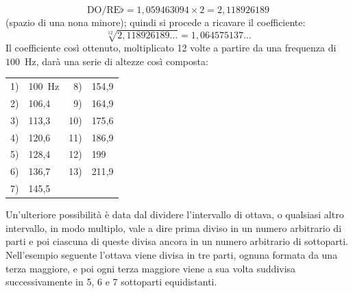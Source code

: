 \[
  \text{DO/RE}\flat = 1{,}059463094 \times 2 = 2{,}118926189
\]
(spazio di una nona minore); quindi si procede a ricavare il coefficiente:
\[
  \sqrt[12]{2{,}118926189\ldots} = 1{,}064575137\ldots
\]
Il coefficiente così ottenuto, moltiplicato 12 volte a partire da una frequenza
di $100$~Hz, darà una serie di altezze così composta:

\begin{center}\small
\begin{tabular}{r l@{\qquad\qquad}r l}
 1) & 100~Hz & 8)  & 154{,}9 \\
 2) & 106{,}4 & 9)  & 164{,}9 \\
 3) & 113{,}3 & 10) & 175{,}6 \\
 4) & 120{,}6 & 11) & 186{,}9 \\
 5) & 128{,}4 & 12) & 199     \\
 6) & 136{,}7 & 13) & 211{,}9 \\
 7) & 145{,}5 &     &         \\
\end{tabular}
\end{center}

Un'ulteriore possibilità è data dal dividere l'intervallo di ottava, o
qualsiasi altro intervallo, in modo multiplo, vale a dire prima diviso in un
numero arbitrario di parti e poi ciascuna di queste divisa ancora in un numero
arbitrario di sottoparti. Nell'esempio seguente l'ottava viene divisa in tre
parti, ognuna formata da una terza maggiore, e poi ogni terza maggiore viene a
sua volta suddivisa successivamente in 5, 6 e 7 sottoparti equidistanti.

\begin{figure}[htbp]
  \centering
\end{figure}

